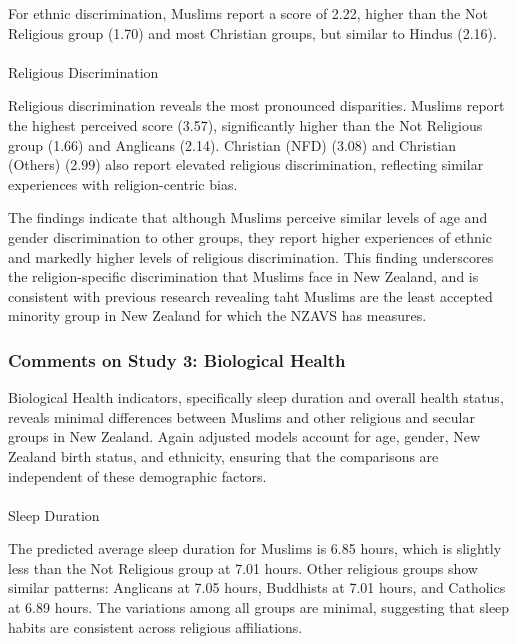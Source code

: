 \documentclass[
  single column]{article}
\makeatletter
\let\oldparagraph\paragraph
\renewcommand{\paragraph}{
    \@ifstar
      \xxxParagraphStar
      \xxxParagraphNoStar
  }
\newcommand{\xxxParagraphStar}[1]{\oldparagraph*{#1}\mbox{}}
\newcommand{\xxxParagraphNoStar}[1]{\oldparagraph{#1}\mbox{}}
\makeatother
\begin{document}
For ethnic discrimination, Muslims report a score of 2.22, higher than
the Not Religious group (1.70) and most Christian groups, but similar to
Hindus (2.16).

\paragraph{Religious Discrimination}\label{religious-discrimination}

Religious discrimination reveals the most pronounced disparities.
Muslims report the highest perceived score (3.57), significantly higher
than the Not Religious group (1.66) and Anglicans (2.14). Christian
(NFD) (3.08) and Christian (Others) (2.99) also report elevated
religious discrimination, reflecting similar experiences with
religion-centric bias.

The findings indicate that although Muslims perceive similar levels of
age and gender discrimination to other groups, they report higher
experiences of ethnic and markedly higher levels of religious
discrimination. This finding underscores the religion-specific
discrimination that Muslims face in New Zealand, and is consistent with
previous research revealing taht Muslims are the least accepted minority
group in New Zealand for which the NZAVS has measures.

\subsubsection{Comments on Study 3: Biological
Health}\label{comments-on-study-3-biological-health}

Biological Health indicators, specifically sleep duration and overall
health status, reveals minimal differences between Muslims and other
religious and secular groups in New Zealand. Again adjusted models
account for age, gender, New Zealand birth status, and ethnicity,
ensuring that the comparisons are independent of these demographic
factors.

\paragraph{Sleep Duration}\label{sleep-duration}

The predicted average sleep duration for Muslims is 6.85 hours, which is
slightly less than the Not Religious group at 7.01 hours. Other
religious groups show similar patterns: Anglicans at 7.05 hours,
Buddhists at 7.01 hours, and Catholics at 6.89 hours. The variations
among all groups are minimal, suggesting that sleep habits are
consistent across religious affiliations.
\end{document}
